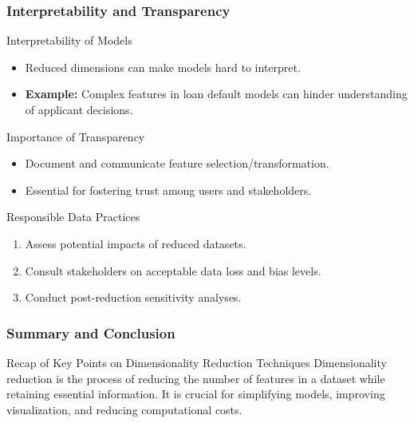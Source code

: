 \documentclass[aspectratio=169]{beamer}
\begin{document}
\begin{frame}[fragile]
  \frametitle{Interpretability and Transparency}
  
  \begin{block}{Interpretability of Models}
    \begin{itemize}
      \item Reduced dimensions can make models hard to interpret.
      \item \textbf{Example:} Complex features in loan default models can hinder understanding of applicant decisions.
    \end{itemize}
  \end{block}
  
  \begin{block}{Importance of Transparency}
    \begin{itemize}
      \item Document and communicate feature selection/transformation.
      \item Essential for fostering trust among users and stakeholders.
    \end{itemize}
  \end{block}
  
  \begin{block}{Responsible Data Practices}
    \begin{enumerate}
      \item Assess potential impacts of reduced datasets.
      \item Consult stakeholders on acceptable data loss and bias levels.
      \item Conduct post-reduction sensitivity analyses.
    \end{enumerate}
  \end{block}
  
\end{frame}

\begin{frame}[fragile]
    \frametitle{Summary and Conclusion}
    \begin{block}{Recap of Key Points on Dimensionality Reduction Techniques}
        Dimensionality reduction is the process of reducing the number of features in a dataset while retaining essential information. It is crucial for simplifying models, improving visualization, and reducing computational costs.
    \end{block}
\end{frame}
\end{document}
